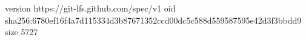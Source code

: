 version https://git-lfs.github.com/spec/v1
oid sha256:6780ef16f4a7d115334d3b87671352ccd00dc5c588d559587595e42d3f3bbdd9
size 5727
